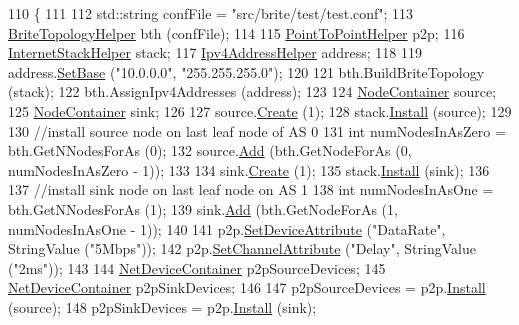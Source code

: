 \begin{DoxyCode}
110 \{
111 
112   std::string confFile = \textcolor{stringliteral}{"src/brite/test/test.conf"};
113   \hyperlink{classns3_1_1BriteTopologyHelper}{BriteTopologyHelper} bth (confFile);
114 
115   \hyperlink{classns3_1_1PointToPointHelper}{PointToPointHelper} p2p;
116   \hyperlink{classns3_1_1InternetStackHelper}{InternetStackHelper} stack;
117   \hyperlink{classns3_1_1Ipv4AddressHelper}{Ipv4AddressHelper} address;
118 
119   address.\hyperlink{classns3_1_1Ipv4AddressHelper_acf7b16dd25bac67e00f5e25f90a9a035}{SetBase} (\textcolor{stringliteral}{"10.0.0.0"}, \textcolor{stringliteral}{"255.255.255.0"});
120 
121   bth.BuildBriteTopology (stack);
122   bth.AssignIpv4Addresses (address);
123 
124   \hyperlink{classns3_1_1NodeContainer}{NodeContainer} source;
125   \hyperlink{classns3_1_1NodeContainer}{NodeContainer} sink;
126 
127   source.\hyperlink{classns3_1_1NodeContainer_a787f059e2813e8b951cc6914d11dfe69}{Create} (1);
128   stack.\hyperlink{classns3_1_1InternetStackHelper_a6645b412f31283d2d9bc3d8a95cebbc0}{Install} (source);
129 
130   \textcolor{comment}{//install source node on last leaf node of AS 0}
131   \textcolor{keywordtype}{int} numNodesInAsZero = bth.GetNNodesForAs (0);
132   source.\hyperlink{classns3_1_1NodeContainer_aa60b3a0e70f2fb324e16ffcf8bf31fcb}{Add} (bth.GetNodeForAs (0, numNodesInAsZero - 1));
133 
134   sink.\hyperlink{classns3_1_1NodeContainer_a787f059e2813e8b951cc6914d11dfe69}{Create} (1);
135   stack.\hyperlink{classns3_1_1InternetStackHelper_a6645b412f31283d2d9bc3d8a95cebbc0}{Install} (sink);
136 
137   \textcolor{comment}{//install sink node on last leaf node on AS 1}
138   \textcolor{keywordtype}{int} numNodesInAsOne = bth.GetNNodesForAs (1);
139   sink.\hyperlink{classns3_1_1NodeContainer_aa60b3a0e70f2fb324e16ffcf8bf31fcb}{Add} (bth.GetNodeForAs (1, numNodesInAsOne - 1));
140 
141   p2p.\hyperlink{classns3_1_1PointToPointHelper_a4577f5ab8c387e5528af2e0fbab1152e}{SetDeviceAttribute} (\textcolor{stringliteral}{"DataRate"}, StringValue (\textcolor{stringliteral}{"5Mbps"}));
142   p2p.\hyperlink{classns3_1_1PointToPointHelper_a6b5317fd17fb61e5a53f8d66a90b63b9}{SetChannelAttribute} (\textcolor{stringliteral}{"Delay"}, StringValue (\textcolor{stringliteral}{"2ms"}));
143 
144   \hyperlink{classns3_1_1NetDeviceContainer}{NetDeviceContainer} p2pSourceDevices;
145   \hyperlink{classns3_1_1NetDeviceContainer}{NetDeviceContainer} p2pSinkDevices;
146 
147   p2pSourceDevices = p2p.\hyperlink{classns3_1_1PointToPointHelper_ab9162fea3e88722666fed1106df1f9ec}{Install} (source);
148   p2pSinkDevices = p2p.\hyperlink{classns3_1_1PointToPointHelper_ab9162fea3e88722666fed1106df1f9ec}{Install} (sink);

\end{DoxyCode}
